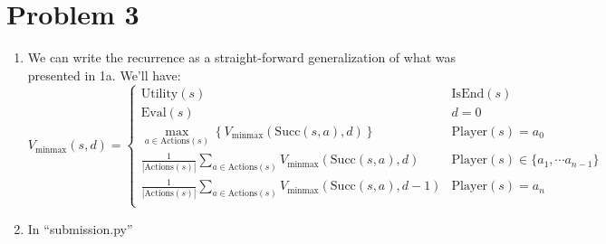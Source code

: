 \documentclass[12pt]{article}
\begin{document}
\section*{Problem 3}
\begin{enumerate}[label=(\alph*)]
  \item We can write the recurrence as a straight-forward generalization of what was presented in 1a. We'll have:
  $$
    V_{\text{minmax}}(s,d) =
      \begin{cases}
        \text{Utility}(s) & \text{IsEnd}(s) \\
        \text{Eval}(s) & d = 0 \\
        \max_{a \in \text{Actions}(s)} \left\{ V_{\text{minmax}}(\text{Succ}(s, a), d)\right\} & \text{Player}(s) = a_0 \\
        \frac{1}{|\text{Actions}(s)|}\sum_{a \in \text{Actions}(s)}  V_{\text{minmax}}(\text{Succ}(s, a), d) & \text{Player}(s) \in \{ a_1, \cdots a_{n-1}\} \\
        \frac{1}{|\text{Actions}(s)|}\sum_{a \in \text{Actions}(s)}  V_{\text{minmax}}(\text{Succ}(s, a), d - 1) & \text{Player}(s) = a_n \\
      \end{cases}
  $$
  \item In ``submission.py''
\end{enumerate}
\end{document}
